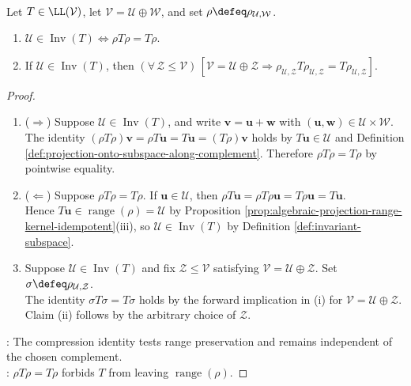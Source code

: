 \begin{proposition} \label{prop:invariant-subspace-projection-criterion} \\
Let $T\in\LL(\mathcal{V})$, let $\mathcal{V}=\mathcal{U}\oplus\mathcal{W}$, and set $\rho\defeq\rho_{\mathcal{U},\mathcal{W}}$.
\begin{enumerate}[label=(\roman*)]
\setlength{\itemsep}{0pt}
\item $\mathcal{U}\in\operatorname{Inv}(T)\Longleftrightarrow\rho T\rho=T\rho$.
\item If $\mathcal{U}\in\operatorname{Inv}(T)$, then $(\forall\,\mathcal{Z}\leq\mathcal{V})\,[\mathcal{V}=\mathcal{U}\oplus\mathcal{Z}\Longrightarrow\rho_{\mathcal{U},\mathcal{Z}}T\rho_{\mathcal{U},\mathcal{Z}}=T\rho_{\mathcal{U},\mathcal{Z}}]$.
\end{enumerate}
\begin{proof}
\begin{enumerate}[label=(\roman*)]
\setlength{\itemsep}{0pt}
\item[$(i)$] ($\Rightarrow$) Suppose $\mathcal{U}\in\operatorname{Inv}(T)$, and write $\mathbf{v}=\mathbf{u}+\mathbf{w}$ with $(\mathbf{u},\mathbf{w})\in\mathcal{U}\times\mathcal{W}$.\\
The identity $(\rho T\rho)\mathbf{v}=\rho T\mathbf{u}=T\mathbf{u}=(T\rho)\mathbf{v}$ holds by $T\mathbf{u}\in\mathcal{U}$ and Definition \ref{def:projection-onto-subspace-along-complement}. Therefore $\rho T\rho=T\rho$ by pointwise equality.
\item[$(i)$] ($\Leftarrow$) Suppose $\rho T\rho=T\rho$. If $\mathbf{u}\in\mathcal{U}$, then $\rho T\mathbf{u}=\rho T\rho\mathbf{u}=T\rho\mathbf{u}=T\mathbf{u}$.\\
Hence $T\mathbf{u}\in\operatorname{range}(\rho)=\mathcal{U}$ by Proposition \ref{prop:algebraic-projection-range-kernel-idempotent}(iii), so $\mathcal{U}\in\operatorname{Inv}(T)$ by Definition \ref{def:invariant-subspace}.
\item[$(ii)$] Suppose $\mathcal{U}\in\operatorname{Inv}(T)$ and fix $\mathcal{Z}\leq\mathcal{V}$ satisfying $\mathcal{V}=\mathcal{U}\oplus\mathcal{Z}$. Set $\sigma\defeq\rho_{\mathcal{U},\mathcal{Z}}$.\\
The identity $\sigma T\sigma=T\sigma$ holds by the forward implication in (i) for $\mathcal{V}=\mathcal{U}\oplus\mathcal{Z}$. Claim (ii) follows by the arbitrary choice of $\mathcal{Z}$.
\end{enumerate}
: The compression identity tests range preservation and remains independent of the chosen complement.\\
: $\rho T\rho=T\rho$ forbids $T$ from leaving $\operatorname{range}(\rho)$.
\end{proof}
\end{proposition}

